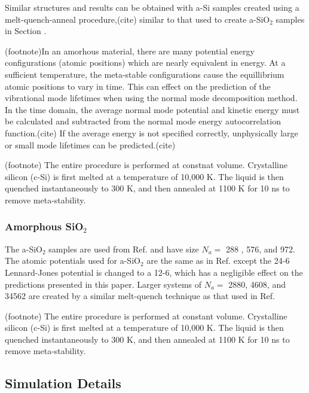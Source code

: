 \documentclass[aps,prb,twocolumn,superscriptaddress,footinbib,amsmath,amssymb,floatfix]{revtex4}
\begin{document}
Similar structures and results can be obtained with a-Si samples 
created using a melt-quench-anneal procedure,(cite) similar to that 
used to create a-SiO$_2$ samples in Section . 

(footnote)In an amorhous material, there are many potential energy 
configurations 
(atomic positions) which are nearly equivalent in energy.  At a sufficient 
temperature, the meta-stable configurations cause the equillibrium 
atomic positions to vary in time.  This can effect on the prediction of 
the vibrational mode 
lifetimes when using the normal 
mode decomposition method. In the time domain, the average normal 
mode potential and kinetic energy must be calculated and subtracted 
from the normal mode energy autocorrelation function.(cite) 
If the average 
energy is not specified correctly, unphysically large or small mode 
lifetimes can be predicted.(cite) 

(footnote)
The entire procedure is performed at constnat volume. Crystalline 
silicon (c-Si) is first 
melted at a temperature of 10,000 K. The liquid is then quenched 
instantaneously to 300 K, and then annealed at 1100 K for 10 ns to remove 
meta-stability. 

\subsubsection{\label{S:Sample:SiO2}Amorphous SiO$_2$}

The a-SiO$_2$ samples are used from Ref.  
and have size $N_a =$ 288 , 576, and 972. The atomic potentials used 
for a-SiO$_2$ are the same as in Ref. 
 except the 24-6 
Lennard-Jones potential is changed to a 12-6, 
which has a negligible effect on the predictions presented in this paper. 
Larger systems of $N_a = $ 2880, 4608, and 34562 are created by a similar 
melt-quench technique as that used in Ref.  

(footnote)
The entire procedure is performed at constant volume. Crystalline 
silicon (c-Si) is first 
melted at a temperature of 10,000 K. The liquid is then quenched 
instantaneously to 300 K, and then annealed at 1100 K for 10 ns to remove 
meta-stability. 

\subsection{\label{S:Simulation}Simulation Details}
\end{document}
